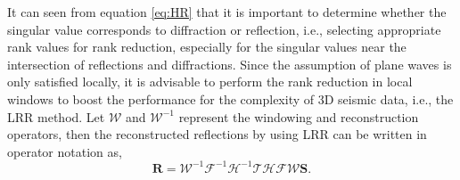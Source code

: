 It can seen from equation \ref{eq:HR} that it is important to determine whether the  singular value corresponds to diffraction or reflection, i.e., selecting appropriate rank values for rank reduction, especially for the singular values near the intersection of reflections and diffractions. Since the assumption of plane waves is only satisfied locally, it is advisable to perform the rank reduction in local windows to boost the performance for the complexity of 3D seismic data, i.e., the LRR method. Let $\mathcal{W}$ and $\mathcal{W}^{-1}$ represent the windowing and reconstruction operators, then the reconstructed reflections by using LRR can be written in operator notation as,
\begin{equation} \label{eq:wr}
\mathbf{R}=\mathcal{W}^{-1}\mathcal{F}^{-1} \mathcal{H}^{-1} \mathcal{T}\mathcal{H}\mathcal{F}\mathcal{W}\mathbf{S}.
\end{equation}


%
%


